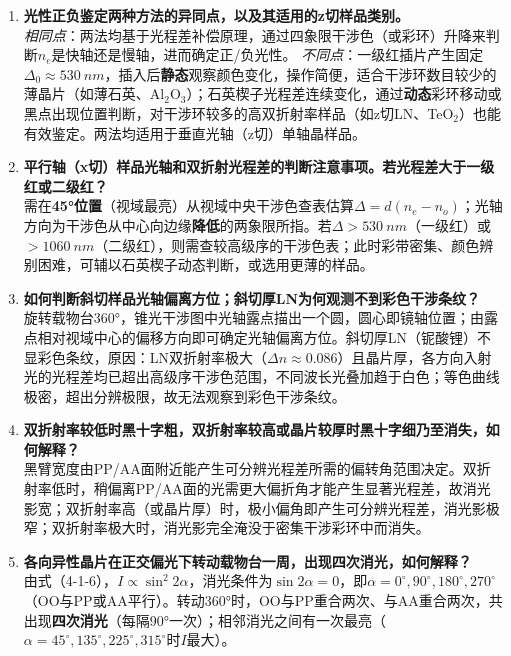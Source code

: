 \documentclass[a4paper,8pt,twocolumn]{article}
\begin{document}
\begin{enumerate}
  \item \textbf{光性正负鉴定两种方法的异同点，以及其适用的z切样品类别。}\\[0.3em]
  \textit{相同点}：两法均基于光程差补偿原理，通过四象限干涉色（或彩环）升降来判断$n_e$是快轴还是慢轴，进而确定正/负光性。
  \textit{不同点}：一级红插片产生固定$\Delta_0\approx\SI{530}{nm}$，插入后\textbf{静态}观察颜色变化，操作简便，适合干涉环数目较少的薄晶片（如薄石英、Al$_2$O$_3$）；石英楔子光程差连续变化，通过\textbf{动态}彩环移动或黑点出现位置判断，对干涉环较多的高双折射率样品（如z切LN、TeO$_2$）也能有效鉴定。两法均适用于垂直光轴（z切）单轴晶样品。

  \item \textbf{平行轴（x切）样品光轴和双折射光程差的判断注意事项。若光程差大于一级红或二级红？}\\[0.3em]
  需在\textbf{45°位置}（视域最亮）从视域中央干涉色查表估算$\Delta=d(n_e-n_o)$；光轴方向为干涉色从中心向边缘\textbf{降低}的两象限所指。若$\Delta>\SI{530}{nm}$（一级红）或$>\SI{1060}{nm}$（二级红），则需查较高级序的干涉色表；此时彩带密集、颜色辨别困难，可辅以石英楔子动态判断，或选用更薄的样品。

  \item \textbf{如何判断斜切样品光轴偏离方位；斜切厚LN为何观测不到彩色干涉条纹？}\\[0.3em]
  旋转载物台360°，锥光干涉图中光轴露点描出一个圆，圆心即镜轴位置；由露点相对视域中心的偏移方向即可确定光轴偏离方位。斜切厚LN（铌酸锂）不显彩色条纹，原因：LN双折射率极大（$\Delta n\approx0.086$）且晶片厚，各方向入射光的光程差均已超出高级序干涉色范围，不同波长光叠加趋于白色；等色曲线极密，超出分辨极限，故无法观察到彩色干涉条纹。

  \item \textbf{双折射率较低时黑十字粗，双折射率较高或晶片较厚时黑十字细乃至消失，如何解释？}\\[0.3em]
  黑臂宽度由PP/AA面附近能产生可分辨光程差所需的偏转角范围决定。双折射率低时，稍偏离PP/AA面的光需更大偏折角才能产生显著光程差，故消光影宽；双折射率高（或晶片厚）时，极小偏角即产生可分辨光程差，消光影极窄；双折射率极大时，消光影完全淹没于密集干涉彩环中而消失。

  \item \textbf{各向异性晶片在正交偏光下转动载物台一周，出现四次消光，如何解释？}\\[0.3em]
  由式（4-1-6），$I\propto\sin^2\!2\alpha$，消光条件为$\sin2\alpha=0$，即$\alpha=0^\circ,90^\circ,180^\circ,270^\circ$（OO与PP或AA平行）。转动360°时，OO与PP重合两次、与AA重合两次，共出现\textbf{四次消光}（每隔90°一次）；相邻消光之间有一次最亮（$\alpha=45^\circ,135^\circ,225^\circ,315^\circ$时$I$最大）。
\end{enumerate}
\end{document}
